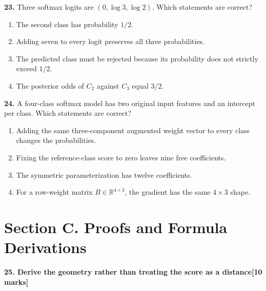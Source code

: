\documentclass[11pt,a4paper]{article}
\begin{document}
\par\noindent\begin{minipage}{\linewidth}
\textbf{23.} Three softmax logits are \((0,\log3,\log2)\). Which statements are correct?
\begin{enumerate}[label=(\Alph*),leftmargin=8mm,itemsep=2pt,topsep=2pt]
\item The second class has probability \(1/2\).
\item Adding seven to every logit preserves all three probabilities.
\item The predicted class must be rejected because its probability does not strictly exceed \(1/2\).
\item The posterior odds of \(C_2\) against \(C_3\) equal \(3/2\).
\end{enumerate}

\end{minipage}\par\vspace{3mm}
\par\noindent\begin{minipage}{\linewidth}
\textbf{24.} A four-class softmax model has two original input features and an intercept per class. Which statements are correct?
\begin{enumerate}[label=(\Alph*),leftmargin=8mm,itemsep=2pt,topsep=2pt]
\item Adding the same three-component augmented weight vector to every class changes the probabilities.
\item Fixing the reference-class score to zero leaves nine free coefficients.
\item The symmetric parameterization has twelve coefficients.
\item For a row-weight matrix \(B\in\mathbb R^{4\times3}\), the gradient has the same \(4\times3\) shape.
\end{enumerate}

\end{minipage}\par\vspace{3mm}
\newpage\section*{Section C. Proofs and Formula Derivations}
\textbf{25. Derive the geometry rather than treating the score as a distance}\hfill\textbf{[10 marks]}\par\medskip
\end{document}
